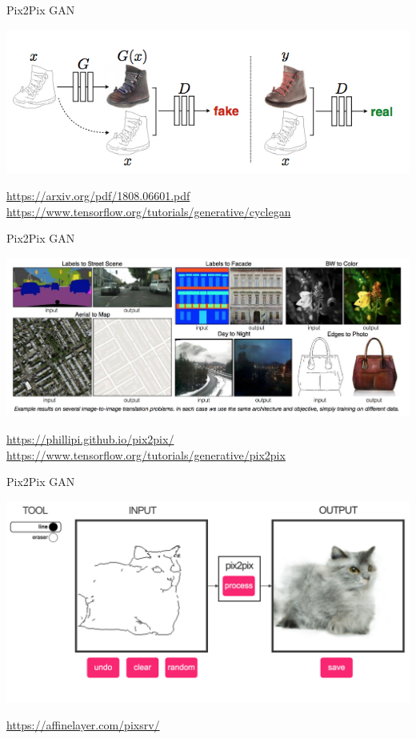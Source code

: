 \documentclass[notes,12pt, aspectratio=169]{beamer}
\begin{document}
\begin{frame}{Pix2Pix GAN}
\begin{center}
	\includegraphics[width=.9\linewidth]{pix2pix_model.png}
\end{center}
\vfill
\footnotesize
{\color{blue} \url{https://arxiv.org/pdf/1808.06601.pdf} \\ 
	\url{https://www.tensorflow.org/tutorials/generative/cyclegan}}
\end{frame}


\begin{frame}{Pix2Pix GAN}
\begin{center}
	\includegraphics[width=.9\linewidth]{pix2pix.png}
\end{center}
\vfill
\footnotesize
{\color{blue} \url{https://phillipi.github.io/pix2pix/} \\
 \url{https://www.tensorflow.org/tutorials/generative/pix2pix}}
\end{frame}

\begin{frame}{Pix2Pix GAN}
\begin{center}
	\includegraphics[width=.9\linewidth]{pp.png}
\end{center}
\vfill
\footnotesize
{\color{blue} \url{https://affinelayer.com/pixsrv/}}
\end{frame}
\end{document}
